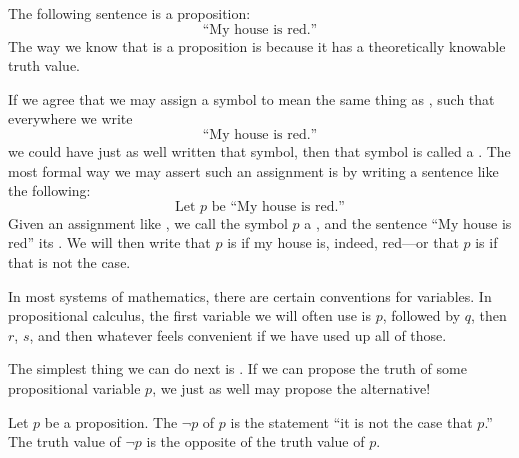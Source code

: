 \begin{ex}
  The following sentence is a proposition:
  \begin{equation}
    \text{``My house is red.''}
    \label{eq:ex:proposition}
  \end{equation}
  The way we know that  is a proposition is because
  it has a theoretically knowable truth value.

  If we agree that we may assign a symbol to mean the same thing as
  ,
  such that everywhere we write
  \begin{equation*}
    \text{``My house is red.''}
  \end{equation*}
  we could have just as well written that symbol, then that symbol is called
  a .
  The most formal way we may assert such an assignment is by writing
  a sentence like the following:
  \begin{equation}
    \text{Let $p$ be ``My house is red.''}
    \label{eq:propostional-symbolic-notation}
  \end{equation}
  Given an assignment like ,
  we call the symbol $p$ a ,
  and the sentence ``My house is red'' its .
  We will then write that $p$ is \ltrue{} if my house is, indeed,
  red---or that $p$ is \lfalse{} if that is not the case.
\end{ex}

In most systems of mathematics, there are certain conventions for variables.
In propositional calculus, the first variable we will often use is $p$, followed
by $q$, then $r$, $s$, and then whatever feels convenient if we have used up
all of those.

The simplest thing we can do next is .
If we can propose the truth of some propositional variable $p$,
we just as well may propose the alternative!
\begin{defn}[negation]
  Let $p$ be a proposition.
  The  $\neg p$ of $p$
  is the statement
  ``it is not the case that \(p\).''
  The truth value of \(\neg p\) is the opposite of the truth value of \(p\).
  \label{defn:propositional-negation}
\end{defn}


